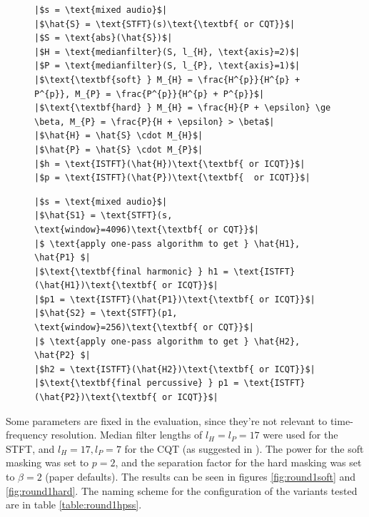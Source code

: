 \documentclass[letter,12pt]{article}
\newlength{\mintednumbersep}
\begin{document}
\begin{figure}[h]
  \centering
 \begin{minipage}{0.48\textwidth}
  \centering
\begin{verbatim}
|$s = \text{mixed audio}$|
|$\hat{S} = \text{STFT}(s)\text{\textbf{ or CQT}}$|
|$S = \text{abs}(\hat{S})$|
|$H = \text{medianfilter}(S, l_{H}, \text{axis}=2)$|
|$P = \text{medianfilter}(S, l_{P}, \text{axis}=1)$|
|$\text{\textbf{soft} } M_{H} = \frac{H^{p}}{H^{p} + P^{p}}, M_{P} = \frac{P^{p}}{H^{p} + P^{p}}$|
|$\text{\textbf{hard} } M_{H} = \frac{H}{P + \epsilon} \ge \beta, M_{P} = \frac{P}{H + \epsilon} > \beta$|
|$\hat{H} = \hat{S} \cdot M_{H}$|
|$\hat{P} = \hat{S} \cdot M_{P}$|
|$h = \text{ISTFT}(\hat{H})\text{\textbf{ or ICQT}}$|
|$p = \text{ISTFT}(\hat{P})\text{\textbf{  or ICQT}}$|
\end{verbatim}
 \end{minipage}
\hspace{0.02\textwidth}
 \begin{minipage}{0.48\textwidth}
  \centering
\begin{verbatim}
|$s = \text{mixed audio}$|
|$\hat{S1} = \text{STFT}(s, \text{window}=4096)\text{\textbf{ or CQT}}$|
|$ \text{apply one-pass algorithm to get } \hat{H1}, \hat{P1} $|
|$\text{\textbf{final harmonic} } h1 = \text{ISTFT}(\hat{H1})\text{\textbf{ or ICQT}}$|
|$p1 = \text{ISTFT}(\hat{P1})\text{\textbf{ or ICQT}}$|
|$\hat{S2} = \text{STFT}(p1, \text{window}=256)\text{\textbf{ or CQT}}$|
|$ \text{apply one-pass algorithm to get } \hat{H2}, \hat{P2} $|
|$h2 = \text{ISTFT}(\hat{H2})\text{\textbf{ or ICQT}}$|
|$\text{\textbf{final percussive} } p1 = \text{ISTFT}(\hat{P2})\text{\textbf{ or ICQT}}$|
\end{verbatim}
 \end{minipage}
  \label{lst:pseudocodes}
\end{figure}

Some parameters are fixed in the evaluation, since they're not relevant to time-frequency resolution. Median filter lengths of $l_{H} = l_{P} = 17$ were used for the STFT, and $l_{H} = 17, l_{P} = 7$ for the CQT (as suggested in \cite{fitzgerald2}). The power for the soft masking was set to $p = 2$, and the separation factor for the hard masking was set to $\beta = 2$ (paper defaults). The results can be seen in figures \ref{fig:round1soft} and \ref{fig:round1hard}. The naming scheme for the configuration of the variants tested are in table \ref{table:round1hpss}.
\end{document}
